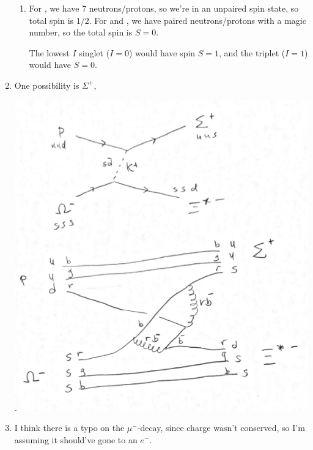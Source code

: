 \documentclass{homework}
\begin{document}
\begin{enumerate}
\begin{enumerate}
			\item  For , we have 7 neutrons/protons, so we're in an unpaired spin state, so total spin is $1/2$.  For  and , we have paired neutrons/protons with a magic number, so the total spin is $S=0$.
			
			The lowest $I$ singlet ($I=0$) would have spin $S=1$, and the triplet ($I=1$) would have $S=0$.
		\end{enumerate}
	
		\pagebreak
		
		\item One possibility is $\Sigma^+$,
		\begin{center}
			\includegraphics[width=0.7\linewidth]{prob6}
		\end{center}
				
		\item I think there is a typo on the $\mu^-$-decay, since charge wasn't conserved, so I'm assuming it should've gone to an $e^-$.
		

\end{enumerate}
\end{document}
